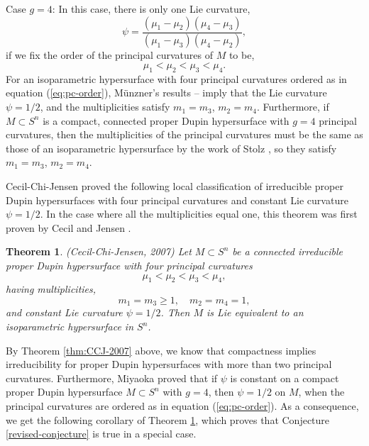 \documentclass[12pt]{article}
\newtheorem{theorem}{Theorem}[section]
\begin{document}
{\noindent
Case $g = 4$: 
In this case, there is only one Lie curvature,
\begin{equation}
\label{eq:lie-curv}
\psi = \frac{(\mu_1 -\mu_2)(\mu_4 - \mu_3)}{(\mu_1 -\mu_3)(\mu_4 - \mu_2)},
\end{equation}
if we fix the order of the principal curvatures of $M$ to be,
\begin{equation}
\label{eq:pc-order}
\mu_1 < \mu_2 < \mu_3 < \mu_4.
\end{equation}
For an isoparametric
hypersurface with four principal curvatures ordered as in equation (\ref{eq:pc-order}),
M\"{u}nzner's results \cite{Mu}--\cite{Mu2} imply that
the Lie curvature
$\psi = 1/2$, and
the multiplicities satisfy $m_1 = m_3$, $m_2 = m_4$.
Furthermore, if $M \subset S^n$ is a compact, connected proper Dupin hypersurface 
with $g=4$ principal curvatures, then the multiplicities of the principal curvatures must be the same as those of an isoparametric hypersurface by the work of Stolz \cite{Stolz}, so they satisfy $m_1 = m_3$, $m_2 = m_4$.

Cecil-Chi-Jensen \cite{CCJ2} proved the following 
local classification of irreducible proper Dupin hypersurfaces with four principal curvatures and constant Lie curvature $\psi = 1/2$. In the case where all the multiplicities equal one, this theorem was first proven
by Cecil and Jensen \cite{CJ3}.

\begin{theorem}
\label{CCJ} 
(Cecil-Chi-Jensen, 2007)
Let $M \subset S^n$ be a connected irreducible proper Dupin hypersurface with four principal curvatures 
\begin{displaymath}
\mu_1 < \mu_2 < \mu_3 < \mu_4,
\end{displaymath}
having multiplicities,
\begin{equation}
\label{eq:restricted}
m_1 = m_3 \geq 1, \quad m_2 = m_4 =1,
\end{equation}
and constant Lie curvature $\psi = 1/2$. Then $M$ is Lie equivalent to an
isoparametric hypersurface in $S^n$.
\end{theorem}

By Theorem \ref{thm:CCJ-2007} above, we know that
compactness implies irreducibility for proper Dupin hypersurfaces with more than two principal curvatures.
Furthermore, Miyaoka \cite{Mi3} proved that if $\psi$ is constant on a compact proper Dupin hypersurface $M \subset S^n$ with $g=4$, then $\psi = 1/2$ on $M$, when
the principal curvatures are ordered as in equation (\ref{eq:pc-order}).  
As a consequence, we get the following corollary of
Theorem \ref{CCJ}, which proves that Conjecture \ref{revised-conjecture} is true in a special case.


}
\end{document}
